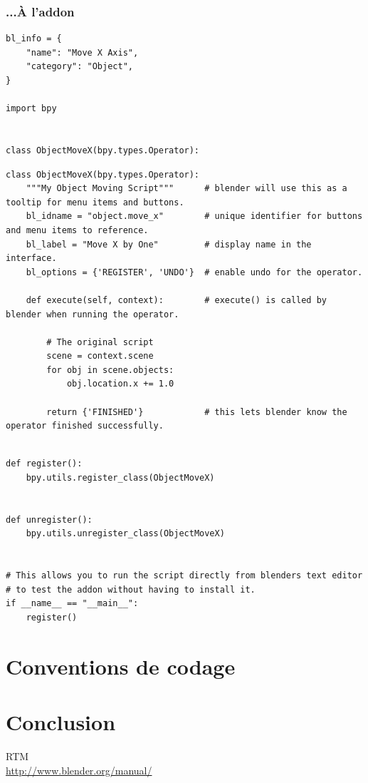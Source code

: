 \documentclass[11pt,usenames,dvipsnames]{beamer}
\begin{document}
\begin{frame}[fragile]
  \frametitle{...À l'addon}
  \begin{lstlisting}
bl_info = {
    "name": "Move X Axis",
    "category": "Object",
}

import bpy


class ObjectMoveX(bpy.types.Operator):
  \end{lstlisting}
\end{frame}

\begin{frame}[fragile]
  \begin{lstlisting}
class ObjectMoveX(bpy.types.Operator):
    """My Object Moving Script"""      # blender will use this as a tooltip for menu items and buttons.
    bl_idname = "object.move_x"        # unique identifier for buttons and menu items to reference.
    bl_label = "Move X by One"         # display name in the interface.
    bl_options = {'REGISTER', 'UNDO'}  # enable undo for the operator.

    def execute(self, context):        # execute() is called by blender when running the operator.

        # The original script
        scene = context.scene
        for obj in scene.objects:
            obj.location.x += 1.0

        return {'FINISHED'}            # this lets blender know the operator finished successfully.
  \end{lstlisting}
\end{frame}

\begin{frame}[fragile]
  \begin{lstlisting}

def register():
    bpy.utils.register_class(ObjectMoveX)


def unregister():
    bpy.utils.unregister_class(ObjectMoveX)


# This allows you to run the script directly from blenders text editor
# to test the addon without having to install it.
if __name__ == "__main__":
    register()
  \end{lstlisting}
\end{frame}

\section{Conventions de codage}


\section{Conclusion}
\begin{frame}
  RTM\\
  \url{http://www.blender.org/manual/}
\end{frame}
\end{document}
